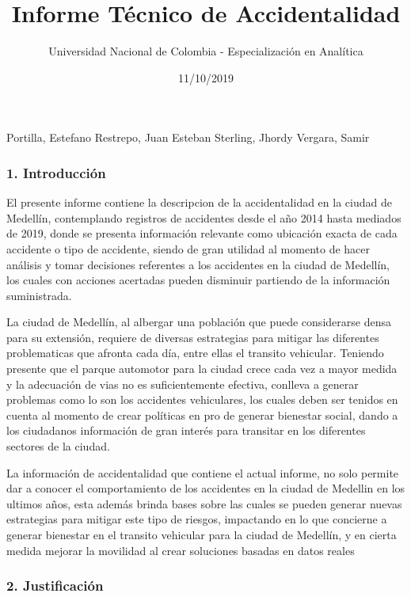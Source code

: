 \documentclass[]{article}
\title{Informe Técnico de Accidentalidad}
\author{Universidad Nacional de Colombia - Especialización en Analítica}
\date{11/10/2019}
\begin{document}
\maketitle

Portilla, Estefano Restrepo, Juan Esteban Sterling, Jhordy Vergara,
Samir

\hypertarget{introduccion}{%
\subsubsection{1. Introducción}\label{introduccion}}

El presente informe contiene la descripcion de la accidentalidad en la
ciudad de Medellín, contemplando registros de accidentes desde el año
2014 hasta mediados de 2019, donde se presenta información relevante
como ubicación exacta de cada accidente o tipo de accidente, siendo de
gran utilidad al momento de hacer análisis y tomar decisiones referentes
a los accidentes en la ciudad de Medellín, los cuales con acciones
acertadas pueden disminuir partiendo de la información suministrada.

La ciudad de Medellín, al albergar una población que puede considerarse
densa para su extensión, requiere de diversas estrategias para mitigar
las diferentes problematicas que afronta cada día, entre ellas el
transito vehicular. Teniendo presente que el parque automotor para la
ciudad crece cada vez a mayor medida y la adecuación de vias no es
suficientemente efectiva, conlleva a generar problemas como lo son los
accidentes vehiculares, los cuales deben ser tenidos en cuenta al
momento de crear políticas en pro de generar bienestar social, dando a
los ciudadanos información de gran interés para transitar en los
diferentes sectores de la ciudad.

La información de accidentalidad que contiene el actual informe, no solo
permite dar a conocer el comportamiento de los accidentes en la ciudad
de Medellin en los ultimos años, esta además brinda bases sobre las
cuales se pueden generar nuevas estrategias para mitigar este tipo de
riesgos, impactando en lo que concierne a generar bienestar en el
transito vehicular para la ciudad de Medellín, y en cierta medida
mejorar la movilidad al crear soluciones basadas en datos reales

\hypertarget{justificacion}{%
\subsubsection{2. Justificación}\label{justificacion}}
\end{document}
